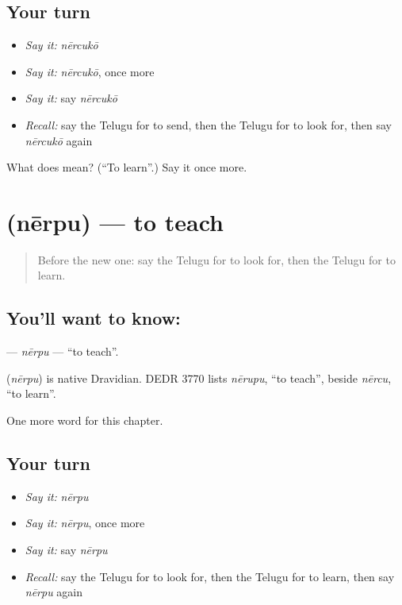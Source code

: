 \subsection*{Your turn}
\begin{itemize}
\raggedright
  \item \emph{Say it:} \emph{nērcukō}
  \item \emph{Say it:} \emph{nērcukō}, once more
  \item \emph{Say it:} say \emph{nērcukō}
  \item \emph{Recall:} say the Telugu for to send, then the Telugu for to look for, then say \emph{nērcukō} again
\end{itemize}

\begin{tcolorbox}[breakable,colback=teal!4,colframe=teal!35!black,title={Before you move on}]
What does  mean? (\textquotedblleft{}To learn\textquotedblright{}.) Say it once more.
\end{tcolorbox}
\section[\texorpdfstring{\te{నేర్పు} (nērpu)}{నేర్పు (nērpu)}]{ (nērpu) — to teach}

\label{lesson:TE-C145-nerpu}



\begin{quote}
Before the new one: say the Telugu for to look for, then the Telugu for to learn.
\end{quote}

\subsection*{You'll want to know: }
\textbf{} — \emph{nērpu} — \textquotedblleft{}to teach\textquotedblright{}.

\begin{cousinweb}
\textbf{} (\emph{nērpu}) is native Dravidian. DEDR 3770 lists \emph{nērupu}, \textquotedblleft{}to teach\textquotedblright{}, beside \emph{nērcu}, \textquotedblleft{}to learn\textquotedblright{}.
\end{cousinweb}

\begin{grammarlens}[title={What you've built}]
One more word for this chapter.
\end{grammarlens}

\subsection*{Your turn}
\begin{itemize}
\raggedright
  \item \emph{Say it:} \emph{nērpu}
  \item \emph{Say it:} \emph{nērpu}, once more
  \item \emph{Say it:} say \emph{nērpu}
  \item \emph{Recall:} say the Telugu for to look for, then the Telugu for to learn, then say \emph{nērpu} again
\end{itemize}

